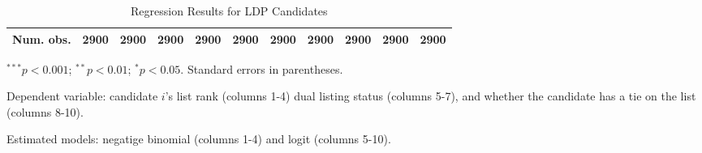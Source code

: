 \begin{table}[!htbp]
\begin{center}
{\begin{threeparttable}
\begin{tabular}{l D{.}{.}{5.5} D{.}{.}{5.5} D{.}{.}{5.5} D{.}{.}{5.5} D{.}{.}{5.5} D{.}{.}{5.5} D{.}{.}{5.5} D{.}{.}{5.5} D{.}{.}{5.5} D{.}{.}{5.5}}
Num. obs.          & 2900                    & 2900                    & 2900                    & 2900                    & 2900                    & 2900                    & 2900                    & 2900                    & 2900                    & 2900                    \\
\bottomrule
\end{tabular}
\begin{tablenotes}[flushleft]
\scriptsize{\item $^{***}p<0.001$; $^{**}p<0.01$; $^{*}p<0.05$. Standard errors in parentheses.
\item Dependent variable: candidate $i$'s list rank (columns 1-4) dual listing status (columns 5-7), and whether the candidate has a tie on the list (columns 8-10).
\item Estimated models: negatige binomial (columns 1-4) and logit (columns 5-10).}
\end{tablenotes}
\end{threeparttable}
}
\caption{Regression Results for LDP Candidates}
\label{tab:ldp}
\end{center}
\end{table}
